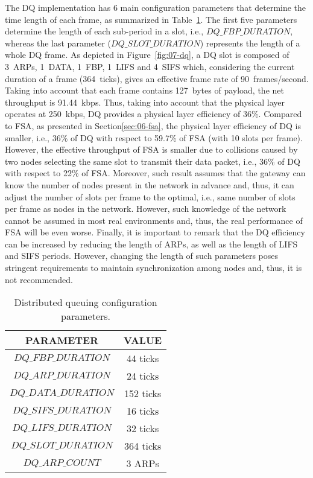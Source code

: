 The DQ implementation has 6 main configuration parameters that determine the time length of each frame, as summarized in Table~\ref{tab:06-dq}. The first five parameters determine the length of each sub-period in a slot, i.e., $DQ\_FBP\_DURATION$, whereas the last parameter ($DQ\_SLOT\_DURATION$) represents the length of a whole DQ frame. As depicted in Figure~\ref{fig:07-dq}, a DQ slot is composed of 3~ARPs, 1~DATA, 1~FBP, 1~LIFS and 4~SIFS which, considering the current duration of a frame (364~ticks), gives an effective frame rate of 90~frames/second. Taking into account that each frame contains 127~bytes of payload, the net throughput is 91.44~kbps. Thus, taking into account that the physical layer operates at 250~kbps, DQ provides a physical layer efficiency of 36\%. Compared to FSA, as presented in Section\ref{sec:06-fsa}, the physical layer efficiency of DQ is smaller, i.e., 36\% of DQ with respect to 59.7\% of FSA (with 10 slots per frame). However, the effective throughput of FSA is smaller due to collisions caused by two nodes selecting the same slot to transmit their data packet, i.e., 36\% of DQ with respect to 22\% of FSA. Moreover, such result assumes that the gateway can know the number of nodes present in the network in advance and, thus, it can adjust the number of slots per frame to the optimal, i.e., same number of slots per frame as nodes in the network. However, such knowledge of the network cannot be assumed in most real environments and, thus, the real performance of FSA will be even worse. Finally, it is important to remark that the DQ efficiency can be increased by reducing the length of ARPs, as well as the length of LIFS and SIFS periods. However, changing the length of such parameters poses stringent requirements to maintain synchronization among nodes and, thus, it is not recommended.

\begin{table}[!it]
\centering
\begin{tabular}{|c|c|}
\hline
\textbf{PARAMETER} & \textbf{VALUE} \\ \hline
$DQ\_FBP\_DURATION$ & 44 ticks \\ \hline
$DQ\_ARP\_DURATION$ & 24 ticks \\ \hline
$DQ\_DATA\_DURATION$ & 152 ticks \\ \hline
$DQ\_SIFS\_DURATION$ & 16 ticks \\ \hline
$DQ\_LIFS\_DURATION$ & 32 ticks \\ \hline
$DQ\_SLOT\_DURATION$ & 364 ticks\\ \hline
$DQ\_ARP\_COUNT$ & 3 ARPs \\
\hline
\end{tabular}
\label{tab:06-dq}
\caption{Distributed queuing configuration parameters.}
\end{table}

